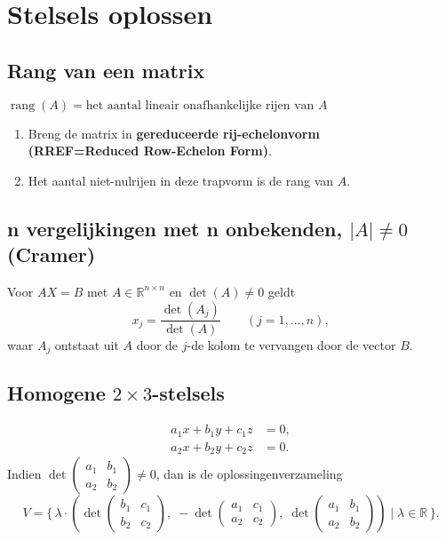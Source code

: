 \documentclass[a5paper]{article}
\begin{document}
\newpage

\section{Stelsels oplossen}

\subsection{Rang van een matrix}
$ \operatorname{rang}(A) = \text{het aantal lineair onafhankelijke rijen van } A $

\begin{enumerate}
  \item Breng de matrix in \textbf{gereduceerde rij-echelonvorm \scriptsize \\ (RREF=Reduced Row-Echelon Form)}.
  
  \item Het aantal niet-nulrijen in deze trapvorm is de rang van \(A\).
\end{enumerate}

\subsection{n vergelijkingen met n onbekenden, $|A|\neq 0$ (Cramer)}
Voor $AX=B$ met $A\in\mathbb{R}^{n\times n}$ en $\det(A)\neq0$ geldt
\[
x_j = \frac{\det(A_j)}{\det(A)} \qquad (j=1,\dots,n),
\]
waar $A_j$ ontstaat uit $A$ door de $j$-de kolom te vervangen door de vector $B$.

\subsection{Homogene $2\times 3$-stelsels}
\begin{align*}
a_1 x + b_1 y + c_1 z &= 0, \\
a_2 x + b_2 y + c_2 z &= 0.
\end{align*}
Indien $\det\!\begin{pmatrix} a_1 & b_1 \\ a_2 & b_2 \end{pmatrix}\neq0$, dan is de oplossingenverzameling
\[
V = \{\, \lambda \cdot (\det\!\begin{pmatrix} b_1 & c_1 \\ b_2 & c_2 \end{pmatrix}, \;
          -\det\!\begin{pmatrix} a_1 & c_1 \\ a_2 & c_2 \end{pmatrix}, \;
           \det\!\begin{pmatrix} a_1 & b_1 \\ a_2 & b_2 \end{pmatrix}) \mid \lambda\in\mathbb{R}\,\}.
\]
\end{document}
